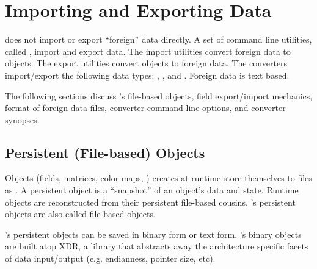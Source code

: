 %
%
%
%
%

\section{Importing and Exporting \sr{} Data}
\label{sec:import_export} 

\sr{} does not import or export ``foreign'' data directly. A set of
command line utilities, called , import and export
data.  The import utilities convert foreign data to \sr{}  
objects.  The export utilities convert \sr{} objects to
foreign data. The converters import/export the following \sr{} data
types: , , and .
Foreign data is text based.

The following sections discuss \sr{}'s file-based objects, field
export/import mechanics, format of foreign data files, converter
command line options, and converter synopses.


\subsection{\sr{} Persistent (File-based) Objects}
\label{sec:sr_file_object}

Objects (fields, matrices, color maps, \etc) \sr{} creates at runtime
store themselves to files as .  A persistent
object is a ``snapshot'' of an object's data and state.  Runtime
objects are reconstructed from their persistent file-based cousins.
\sr{}'s persistent objects are also called \sr{} file-based objects.

\sr{}'s persistent objects can be saved in binary form or text form.
\sr{}'s binary objects are built atop XDR, a library that abstracts
away the architecture specific facets of data input/output (e.g.
endianness, pointer size, etc).

